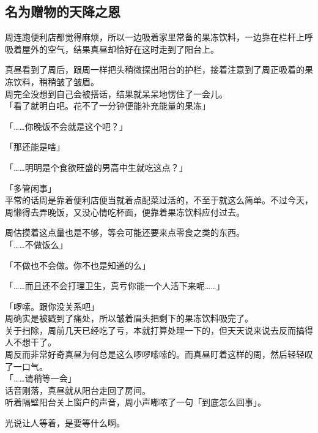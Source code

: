 \subsection{名为赠物的天降之恩}

周连跑便利店都觉得麻烦，所以一边吸着家里常备的果冻饮料，一边靠在栏杆上呼吸着屋外的空气，结果真昼却恰好在这时走到了阳台上。

真昼看到了周后，跟周一样把头稍微探出阳台的护栏，接着注意到了周正吸着的果冻饮料，稍稍皱了皱眉。\\

周完全没想到自己会被搭话，结果就呆呆地愣住了一会儿。\\

「看了就明白吧。花不了一分钟便能补充能量的果冻」

「……你晚饭不会就是这个吧？」

「那还能是啥」

「……明明是个食欲旺盛的男高中生就吃这点？」

「多管闲事」\\

平常的话周是靠着便利店便当就着点配菜过活的，不至于就这么简单。不过今天，周懒得去弄晚饭，又没心情吃杯面，便靠着果冻饮料应付过去。

周估摸着这点量也是不够，等会可能还要来点零食之类的东西。\\

「……不做饭么」

「不做也不会做。你不也是知道的么」

「……而且还不会打理卫生，真亏你能一个人活下来呢……」

「啰嗦。跟你没关系吧」\\

周确实是被戳到了痛处，所以皱着眉头把剩下的果冻饮料吸完了。\\

关于扫除，周前几天已经吃了亏，本就打算处理一下的，但天天说来说去反而搞得人不想干了。\\

周反而非常好奇真昼为何总是这么啰啰嗦嗦的。而真昼盯着这样的周，然后轻轻叹了一口气。\\

「……请稍等一会」\\

话音刚落，真昼就从阳台走回了房间。\\

听着隔壁阳台关上窗户的声音，周小声嘟哝了一句「到底怎么回事」。

光说让人等着，是要等什么啊。\\

